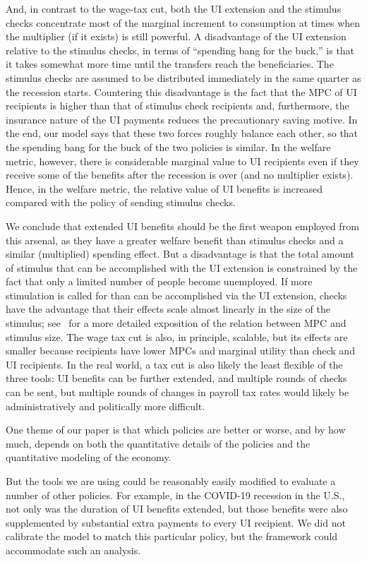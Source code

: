 \documentclass{econsocart}
\begin{document}
And, in contrast to the wage-tax cut, both the UI extension and the stimulus checks concentrate most of the marginal increment to consumption at times when the multiplier (if it exists) is still powerful.  A disadvantage of the UI extension relative to the stimulus checks, in terms of ``spending bang for the buck,'' is that it takes somewhat more time until the transfers reach the beneficiaries. The stimulus checks are assumed to be distributed immediately in the same quarter as the recession starts. Countering this disadvantage is the fact that the MPC of UI recipients is higher than that of stimulus check recipients and, furthermore, the insurance nature of the UI payments reduces the precautionary saving motive. In the end, our model says that these two forces roughly balance each other, so that the spending bang for the buck of the two policies is similar. In the welfare metric, however, there is considerable marginal value to UI recipients even if they receive some of the benefits after the recession is over (and no multiplier exists). Hence, in the welfare metric, the relative value of UI benefits is increased compared with the policy of sending stimulus checks.

We conclude that extended UI benefits should be the first weapon employed from this arsenal, as they have a greater welfare benefit than stimulus checks and a similar (multiplied) spending effect.  But a disadvantage is that the total amount of stimulus that can be accomplished with the UI extension is constrained by the fact that only a limited number of people become unemployed.  If more stimulation is called for than can be accomplished via the UI extension, checks have the advantage that their effects scale almost linearly in the size of the stimulus; see~\cite{beraja2024size} for a more detailed exposition of the relation between MPC and stimulus size.  The wage tax cut is also, in principle, scalable, but its effects are smaller because recipients have lower MPCs and marginal utility than check and UI recipients.  In the real world, a tax cut is also likely the least flexible of the three tools:  UI benefits can be further extended, and multiple rounds of checks can be sent, but multiple rounds of changes in payroll tax rates would likely be administratively and politically more difficult.

One theme of our paper is that which policies are better or worse, and by how much, depends on both the quantitative details of the policies and the quantitative modeling of the economy.

But the tools we are using could be reasonably easily modified to evaluate a number of other policies.  For example, in the COVID-19 recession in the U.S., not only was the duration of UI benefits extended, but those benefits were also supplemented by substantial extra payments to every UI recipient.  We did not calibrate the model to match this particular policy, but the framework could accommodate such an analysis.

\smartbib
\end{document}
